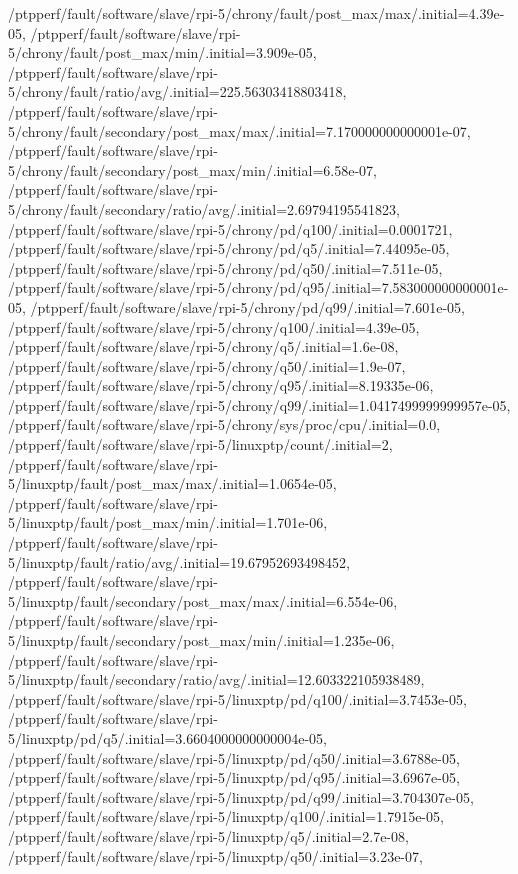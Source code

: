 {    /ptpperf/fault/software/slave/rpi-5/chrony/fault/post_max/max/.initial=4.39e-05,
    /ptpperf/fault/software/slave/rpi-5/chrony/fault/post_max/min/.initial=3.909e-05,
    /ptpperf/fault/software/slave/rpi-5/chrony/fault/ratio/avg/.initial=225.56303418803418,
    /ptpperf/fault/software/slave/rpi-5/chrony/fault/secondary/post_max/max/.initial=7.170000000000001e-07,
    /ptpperf/fault/software/slave/rpi-5/chrony/fault/secondary/post_max/min/.initial=6.58e-07,
    /ptpperf/fault/software/slave/rpi-5/chrony/fault/secondary/ratio/avg/.initial=2.69794195541823,
    /ptpperf/fault/software/slave/rpi-5/chrony/pd/q100/.initial=0.0001721,
    /ptpperf/fault/software/slave/rpi-5/chrony/pd/q5/.initial=7.44095e-05,
    /ptpperf/fault/software/slave/rpi-5/chrony/pd/q50/.initial=7.511e-05,
    /ptpperf/fault/software/slave/rpi-5/chrony/pd/q95/.initial=7.583000000000001e-05,
    /ptpperf/fault/software/slave/rpi-5/chrony/pd/q99/.initial=7.601e-05,
    /ptpperf/fault/software/slave/rpi-5/chrony/q100/.initial=4.39e-05,
    /ptpperf/fault/software/slave/rpi-5/chrony/q5/.initial=1.6e-08,
    /ptpperf/fault/software/slave/rpi-5/chrony/q50/.initial=1.9e-07,
    /ptpperf/fault/software/slave/rpi-5/chrony/q95/.initial=8.19335e-06,
    /ptpperf/fault/software/slave/rpi-5/chrony/q99/.initial=1.0417499999999957e-05,
    /ptpperf/fault/software/slave/rpi-5/chrony/sys/proc/cpu/.initial=0.0,
    /ptpperf/fault/software/slave/rpi-5/linuxptp/count/.initial=2,
    /ptpperf/fault/software/slave/rpi-5/linuxptp/fault/post_max/max/.initial=1.0654e-05,
    /ptpperf/fault/software/slave/rpi-5/linuxptp/fault/post_max/min/.initial=1.701e-06,
    /ptpperf/fault/software/slave/rpi-5/linuxptp/fault/ratio/avg/.initial=19.67952693498452,
    /ptpperf/fault/software/slave/rpi-5/linuxptp/fault/secondary/post_max/max/.initial=6.554e-06,
    /ptpperf/fault/software/slave/rpi-5/linuxptp/fault/secondary/post_max/min/.initial=1.235e-06,
    /ptpperf/fault/software/slave/rpi-5/linuxptp/fault/secondary/ratio/avg/.initial=12.603322105938489,
    /ptpperf/fault/software/slave/rpi-5/linuxptp/pd/q100/.initial=3.7453e-05,
    /ptpperf/fault/software/slave/rpi-5/linuxptp/pd/q5/.initial=3.6604000000000004e-05,
    /ptpperf/fault/software/slave/rpi-5/linuxptp/pd/q50/.initial=3.6788e-05,
    /ptpperf/fault/software/slave/rpi-5/linuxptp/pd/q95/.initial=3.6967e-05,
    /ptpperf/fault/software/slave/rpi-5/linuxptp/pd/q99/.initial=3.704307e-05,
    /ptpperf/fault/software/slave/rpi-5/linuxptp/q100/.initial=1.7915e-05,
    /ptpperf/fault/software/slave/rpi-5/linuxptp/q5/.initial=2.7e-08,
    /ptpperf/fault/software/slave/rpi-5/linuxptp/q50/.initial=3.23e-07,
}
